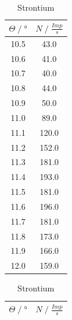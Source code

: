\begin{table}
    \centering
    \begin{tabular}{c c}
        \toprule
        $\Theta\;/\;°$& $N\;/\;\frac{Imp}{s}$\\
        \midrule
        10.5&	43.0\\
        10.6&	41.0\\
        10.7&	40.0\\
        10.8&	44.0\\
        10.9&	50.0\\
        11.0&	89.0\\
        11.1&	120.0\\
        11.2&	152.0\\
        11.3&	181.0\\
        11.4&	193.0\\
        11.5&	181.0\\
        11.6&	196.0\\
        11.7&	181.0\\
        11.8&	173.0\\
        11.9&	166.0\\
        12.0&	159.0\\
        \bottomrule
    \end{tabular}
    \caption{Strontium}
\end{table}
\begin{table}
    \centering
    \begin{tabular}{c c}
        \toprule
        $\Theta\;/\;°$& $N\;/\;\frac{Imp}{s}$\\
        \midrule
        \bottomrule
    \end{tabular}
    \caption{Strontium}
\end{table}


